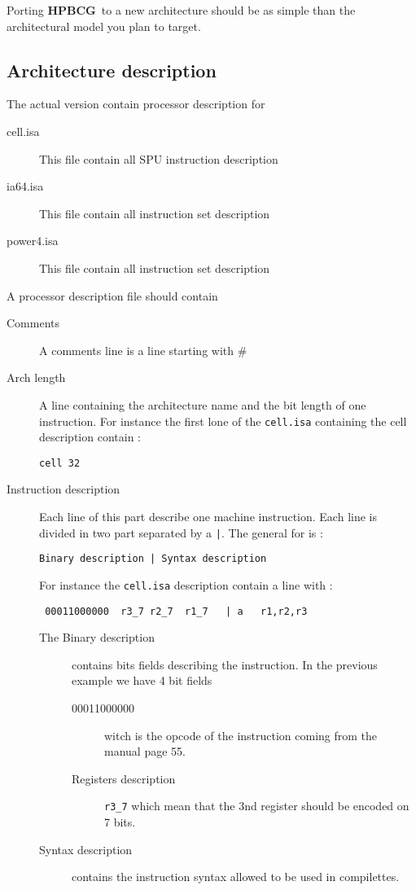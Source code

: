 \documentclass{article}
\newcommand{\hpbcg}{\textbf{HPBCG}\ }
\begin{document}
Porting \hpbcg to a new architecture should be as simple than the
architectural model you plan to target.

\subsection{Architecture description}

The actual version contain processor description for 
\begin{description}
\item[cell.isa] This file contain all SPU instruction description
\item[ia64.isa] This file contain all instruction set description
\item[power4.isa] This file contain all instruction set description
\end{description}

A processor description file should contain
\begin{description}
\item[Comments] A comments line is a line starting with \#
\item[Arch length] A line containing the architecture name and the bit
  length of one instruction. For instance the first lone of the 
\verb|cell.isa| containing the cell description contain :
\begin{verbatim}
cell 32
\end{verbatim}
\item[Instruction description] Each line of this part describe one
  machine instruction. Each line is divided in two part separated by a
  \verb-|-. The general for is :

\begin{verbatim}
Binary description | Syntax description
\end{verbatim}

For instance the \verb|cell.isa| description contain a line with :
\begin{verbatim}
 00011000000  r3_7 r2_7  r1_7   | a   r1,r2,r3
\end{verbatim}
  \begin{description}
  \item[The Binary description] contains bits fields describing the
    instruction. In the previous example we have 4 bit fields
    \begin{description}
      \item[00011000000] witch is the opcode of the instruction
        coming from the manual\cite{SPU1} page 55.
      \item[Registers description] \verb|r3_7| which mean that the 3nd
        register should be encoded on 7 bits.
    \end{description}
  \item[Syntax description] contains the instruction syntax allowed to
    be used in compilettes.
  \end{description}

\end{description}
\end{document}
